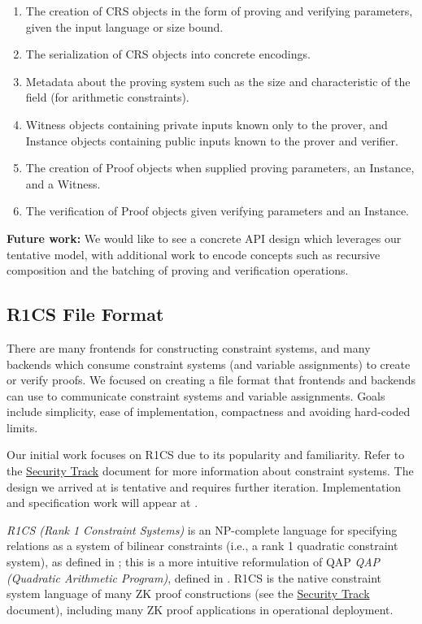 \begin{enumerate}
 \item The creation of CRS objects in the form of proving and verifying parameters, given the input language or size bound.
 \item The serialization of CRS objects into concrete encodings.
 \item Metadata about the proving system such as the size and characteristic of the field (for arithmetic constraints).
 \item Witness objects containing private inputs known only to the prover, and Instance objects containing public inputs known to the prover and verifier.
 \item The creation of Proof objects when supplied proving parameters, an Instance, and a Witness.
 \item The verification of Proof objects given verifying parameters and an Instance.
\end{enumerate}

\textbf{Future work:} 
We would like to see a concrete API design which leverages our tentative model, with additional work to encode concepts such as recursive composition and the batching of proving and verification operations.


\subsection{R1CS File Format}

There are many frontends for constructing constraint systems, and many backends which consume constraint systems (and variable assignments) to create or verify proofs. We focused on creating a file format that frontends and backends can use to communicate constraint systems and variable assignments. Goals include simplicity, ease of implementation, compactness and avoiding hard-coded limits.

Our initial work focuses on R1CS due to its popularity and familiarity. 
Refer to the \hyperref[chap:security]{Security Track} document for more information about constraint systems. 
The design we arrived at is tentative and requires further iteration. 
Implementation and specification work will appear at .


\emph{R1CS (Rank 1 Constraint Systems)} is an NP-complete language for specifying relations as a system of bilinear constraints (i.e., a rank 1 quadratic constraint system), 
as defined in \cite[Appendix E in extended version]{2013:crypto:SNARKs-for-C}; %
this is a more intuitive reformulation of QAP \emph{QAP (Quadratic Arithmetic Program)}, 
defined in \cite{2013:SP:Pinocchio}. %
R1CS is the native constraint system language of many ZK proof constructions (see the \hyperref[chap:security]{Security Track} document), including many ZK proof applications in operational deployment.

